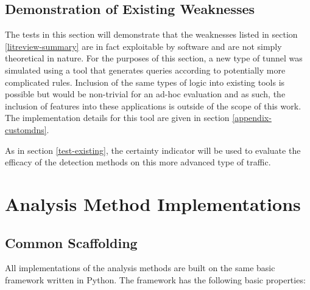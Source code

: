 \documentclass[12pt]{report}
\theoremstyle{remark}
\theoremstyle{definition}
\theoremstyle{definition}
\theoremstyle{definition}
\begin{document}


\subsection{Demonstration of Existing Weaknesses}
\label{test-weakness}

The tests in this section will demonstrate that the weaknesses listed in section
\ref{litreview-summary} are in fact exploitable by software and are not simply
theoretical in nature. For the purposes of this section, a new type of tunnel
was simulated using a tool that generates queries according to potentially more
complicated rules. Inclusion of the same types of logic into existing tools is
possible but would be non-trivial for an ad-hoc evaluation and as such, the
inclusion of features into these applications is outside of the scope of this
work. The implementation details for this tool are given in section
\ref{appendix-customdns}.

As in section \ref{test-existing}, the certainty indicator will be used to
evaluate the efficacy of the detection methods on this more advanced type of
traffic.

\section{Analysis Method Implementations}
\label{implementations}
\subsection{Common Scaffolding}
\label{scaffolding}
All implementations of the analysis methods are built on the same basic
framework written in Python. The framework has the following basic properties:
\end{document}
